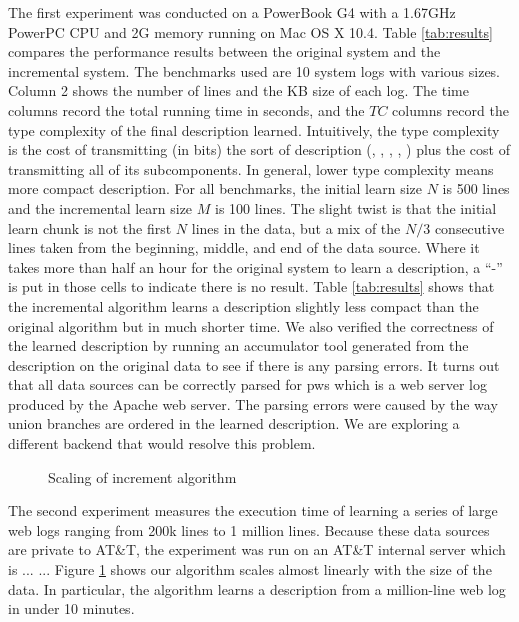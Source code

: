 The first experiment was conducted on a PowerBook G4 with a 1.67GHz PowerPC
CPU and 2G memory running on Mac OS X 10.4. 
Table \ref{tab:results} compares the performance results between
the original \learnpads{} system and the incremental system. 
The benchmarks used are 10 system logs with various sizes. 
Column 2 shows the number of lines and the KB size of each log. 
The time columns record the total
running time in seconds, and the $TC$ columns record the type complexity
of the final description learned. Intuitively, the type complexity
is the cost of transmitting (in bits) the sort of description (\ie{}, ,
, , \etc{}) plus the cost of transmitting all of its
subcomponents. In general, lower type complexity means
more compact description. For all benchmarks, the initial learn size $N$ is 500 lines 
and the incremental learn size $M$ is 100 lines. 
The slight twist is that the initial learn chunk is not the first $N$ lines in the
data, but a mix of the $N/3$ consecutive lines taken from the beginning, middle,
and end of the data source. 
Where it takes more than half an hour for the original \learnpads{}
system to learn a description, a ``-'' is put in those cells to 
indicate there is no result. Table \ref{tab:results} shows that
the incremental algorithm learns a description slightly less compact than the
original algorithm but in much shorter time. We also verified the correctness of the learned
description by running an accumulator tool \cite{fisher+:pads} generated from the 
description on the original data to see if there is any parsing errors. 
It turns out that all data sources can be correctly parsed for pws which 
is a web server log produced by the Apache web server. 
The parsing errors were caused by the way union branches are ordered in the learned 
description. We are exploring a different
\pads{} backend that would resolve this problem.

\begin{figure}[t]
\begin{center}
\caption{Scaling of increment algorithm}
\label{fig:scale}
\end{center}
\end{figure}

The second experiment measures the execution time of learning 
a series of large web logs ranging from 200k lines to 1 million lines. Because
these data sources are private to AT\&T, the experiment was run on 
an AT\&T internal server which is ... ...
Figure \ref{fig:scale} shows our algorithm scales almost linearly with the size
of the data. In particular, the algorithm learns a description from a million-line
web log in under 10 minutes.

